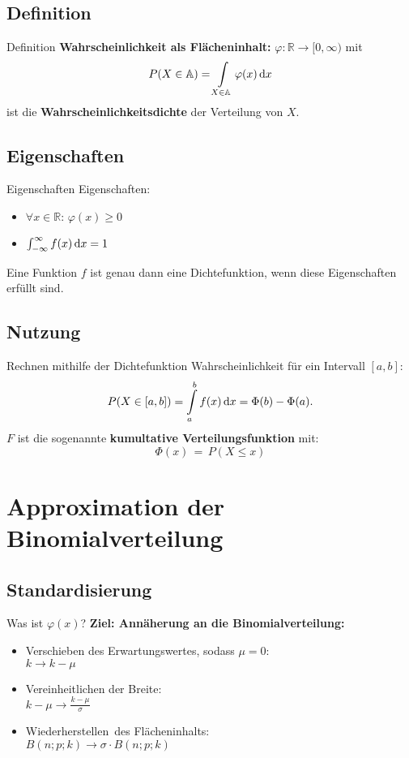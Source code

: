 \documentclass[14pt]{beamer}
\begin{document}
\subsection{Definition}
\begin{frame}{Definition}
\textbf{Wahrscheinlichkeit als Flächeninhalt:}
$\varphi \colon \mathbb{R} \rightarrow [0,\infty)$ mit
$$P(X \in \mathbb{A})=\int\displaylimits_{X \in \mathbb{A}} \varphi(x)\,{\mathrm d}x$$
ist die \textbf{Wahrscheinlichkeitsdichte} der Verteilung von $X$.
\end{frame}

\subsection{Eigenschaften}
\begin{frame}{Eigenschaften}
Eigenschaften:
\begin{itemize}
\item $\forall x \in \mathbb{R}:\, \varphi(x)\geq 0$
\item $\int\displaylimits_{-\infty}^\infty f(x)\,{\mathrm d}x = 1$
\end{itemize}
Eine Funktion $f$ ist genau dann eine Dichtefunktion, wenn diese Eigenschaften erfüllt sind.
\end{frame}

\subsection{Nutzung}
\begin{frame}{Rechnen mithilfe der Dichtefunktion}
Wahrscheinlichkeit für ein Intervall $[a,b]$:
$$P(X\in [a,b]) = \int\displaylimits_a^b f(x)\, {\rm d}x = \Phi(b)-\Phi(a).$$
$F$ ist die sogenannte \textbf{kumultative Verteilungsfunktion} mit:
$$\Phi(x) \, = \, P(X \le x)$$
\end{frame}

\section{Approximation der Binomialverteilung}
\subsection{Standardisierung}
\begin{frame}{Was ist $\varphi(x)$?}
\textbf{Ziel: Annäherung an die Binomialverteilung:}
\pause
\begin{itemize}
\item Verschieben des Erwartungswertes, sodass $\mu=0$:\\
$k \to k-\mu$
\item Vereinheitlichen der Breite:\\
$k-\mu \to \frac{k-\mu}{\sigma}$
\pause
\item \glqq Wiederherstellen\grqq\ des Flächeninhalts:\\
$B(n;p;k) \to \sigma \cdot B(n;p;k)$
\end{itemize}

\end{frame}
\end{document}
